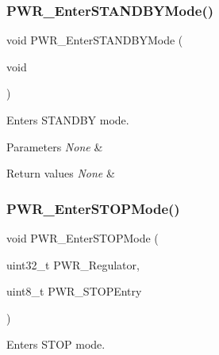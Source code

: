\subsubsection{\texorpdfstring{PWR\_EnterSTANDBYMode()}{PWR\_EnterSTANDBYMode()}}
{\footnotesize\ttfamily void P\+W\+R\+\_\+\+Enter\+S\+T\+A\+N\+D\+B\+Y\+Mode (\begin{DoxyParamCaption}\item[{void}]{ }\end{DoxyParamCaption})}



Enters S\+T\+A\+N\+D\+BY mode. 


\begin{DoxyParams}{Parameters}
{\em None} & \\
\hline
\end{DoxyParams}

\begin{DoxyRetVals}{Return values}
{\em None} & \\
\hline
\end{DoxyRetVals}
\mbox{\label{group___p_w_r___private___functions_ga694676ac06a9baf50eae45adae0118ab}} 
\subsubsection{\texorpdfstring{PWR\_EnterSTOPMode()}{PWR\_EnterSTOPMode()}}
{\footnotesize\ttfamily void P\+W\+R\+\_\+\+Enter\+S\+T\+O\+P\+Mode (\begin{DoxyParamCaption}\item[{uint32\+\_\+t}]{P\+W\+R\+\_\+\+Regulator,  }\item[{uint8\+\_\+t}]{P\+W\+R\+\_\+\+S\+T\+O\+P\+Entry }\end{DoxyParamCaption})}



Enters S\+T\+OP mode. 


